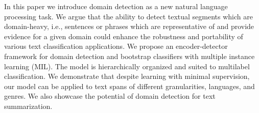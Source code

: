 In this paper we introduce domain detection as a new natural language processing task. We argue that the ability to detect textual segments which are domain-heavy, i.e., sentences or phrases which are representative of and provide evidence for a given domain could enhance the robustness and portability of various text classification applications. We propose an encoder-detector framework for domain detection and bootstrap classifiers with multiple instance learning (MIL). The model is hierarchically organized and suited to multilabel classification. We demonstrate that despite learning with minimal supervision, our model can be applied to text spans of different granularities, languages, and genres. We also showcase the potential of domain detection for text summarization.